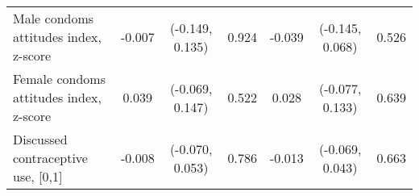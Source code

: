 \begin{table}
\begin{tabular}[t]{lcccccc}
\hspace{1em}Male condoms attitudes index, z-score & -0.007 & (-0.149, 0.135) & 0.924 & -0.039 & (-0.145, 0.068) & 0.526\\
\rowcolor{gray!6}  \hspace{1em}Female condoms attitudes index, z-score & 0.039 & (-0.069, 0.147) & 0.522 & 0.028 & (-0.077, 0.133) & 0.639\\
\hspace{1em}Discussed contraceptive use, [0,1] & -0.008 & (-0.070, 0.053) & 0.786 & -0.013 & (-0.069, 0.043) & 0.663\\
\bottomrule
\end{tabular}
\end{table}
